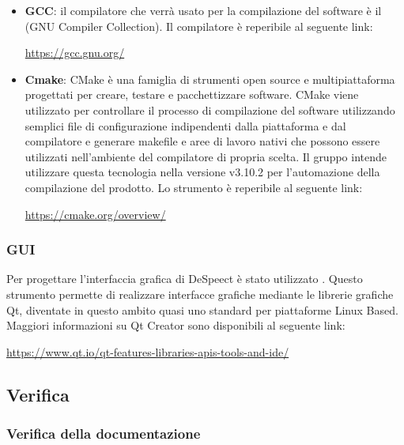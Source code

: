\documentclass[../NormediProgetto.tex]{subfiles}
\begin{document}
	\begin{itemize}
		\item \textbf{GCC}: il compilatore che verrà usato per la compilazione del software è il  (GNU Compiler Collection). Il compilatore è reperibile al seguente link:
		\begin{center}
			\centerline{\url{https://gcc.gnu.org/}}
		\end{center}
	
		\item \textbf{Cmake}: CMake è una famiglia di strumenti open source e multipiattaforma progettati per creare, testare e pacchettizzare software. CMake viene utilizzato per controllare il processo di compilazione del software utilizzando semplici file di configurazione indipendenti dalla piattaforma e dal compilatore e generare makefile e aree di lavoro nativi che possono essere utilizzati nell'ambiente del compilatore di propria scelta. Il gruppo intende utilizzare questa tecnologia nella versione v3.10.2 per l’automazione della compilazione del prodotto. Lo strumento è reperibile al seguente link:
		\begin{center}
			\centerline{\url{https://cmake.org/overview/}}
		\end{center}
	
	\end{itemize}

	\subsubsection{GUI}

	Per progettare l'interfaccia grafica di DeSpeect è stato utilizzato . Questo strumento permette di realizzare interfacce grafiche mediante le librerie grafiche Qt, diventate in questo ambito quasi uno standard per piattaforme Linux Based. Maggiori informazioni su Qt Creator sono disponibili al seguente link: 
	\begin{center}
		\centerline{\url{https://www.qt.io/qt-features-libraries-apis-tools-and-ide/}}
	\end{center}
	
	
	\subsection{Verifica}
	
	\subsubsection{Verifica della documentazione}
	
\end{document}
